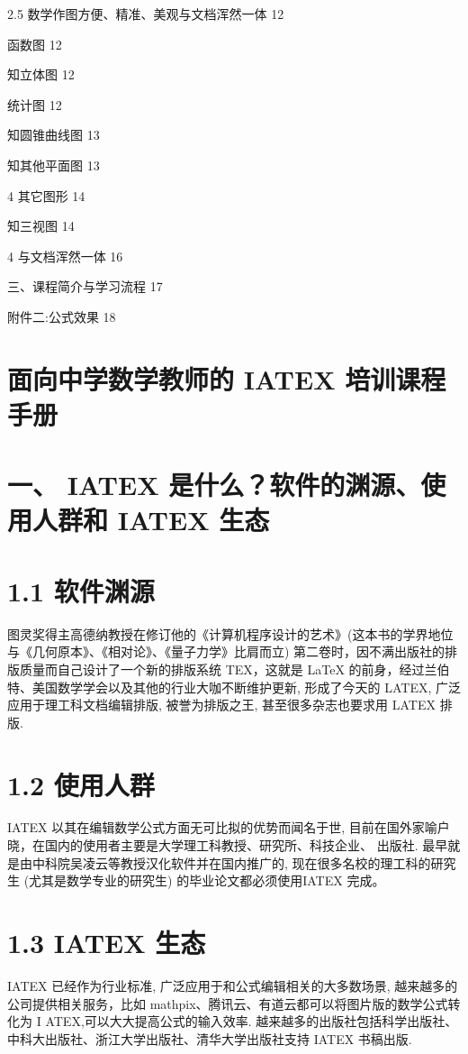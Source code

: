 \documentclass[10pt]{article}
\begin{document}
2.5 数学作图方便、精准、美观与文档浑然一体 12

函数图 12

知立体图 12

统计图 12

知圆锥曲线图 13

知其他平面图 13

4 其它图形 14

知三视图 14

4 与文档浑然一体 16

三、课程简介与学习流程 17

附件二:公式效果 18

\section*{面向中学数学教师的 IATEX 培训课程手册}

\section*{一、 IATEX 是什么？软件的渊源、使用人群和 IATEX 生态}

\section*{1.1 软件渊源}

图灵奖得主高德纳教授在修订他的《计算机程序设计的艺术》(这本书的学界地位与《几何原本》、《相对论》、《量子力学》比肩而立) 第二卷时，因不满出版社的排版质量而自己设计了一个新的排版系统 TEX，这就是 LaTeX 的前身，经过兰伯特、美国数学学会以及其他的行业大咖不断维护更新, 形成了今天的 LATEX, 广泛应用于理工科文档编辑排版, 被誉为排版之王, 甚至很多杂志也要求用 LATEX 排版.

\section*{1.2 使用人群}

IATEX 以其在编辑数学公式方面无可比拟的优势而闻名于世, 目前在国外家喻户晓，在国内的使用者主要是大学理工科教授、研究所、科技企业、 出版社. 最早就是由中科院吴凌云等教授汉化软件并在国内推广的, 现在很多名校的理工科的研究生 (尤其是数学专业的研究生) 的毕业论文都必须使用IATEX 完成。

\section*{1.3 IATEX 生态}

IATEX 已经作为行业标准, 广泛应用于和公式编辑相关的大多数场景, 越来越多的公司提供相关服务，比如 mathpix、腾讯云、有道云都可以将图片版的数学公式转化为 \(\mathrm{I}\) ATEX,可以大大提高公式的输入效率. 越来越多的出版社包括科学出版社、中科大出版社、浙江大学出版社、清华大学出版社支持 IATEX 书稿出版.
\end{document}

